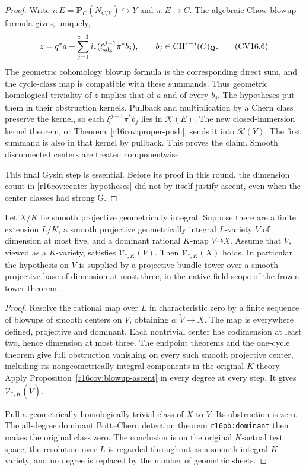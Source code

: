 \begin{proof}
Write $i:E=\mathbf P_C(N_{C/V})\hookrightarrow Y$ and $\pi:E\to C$.
The algebraic Chow blowup formula gives, uniquely,
\[
 z=q^*a+\sum_{j=1}^{c-1}
                i_*(\xi_{\rm alg}^{j-1}\pi^*b_j),
 \qquad b_j\in\operatorname{CH}^{r-j}(C)_{\mathbf Q}.
 \tag{CV16.6}\label{r16cov:blowup-cycle}
\]
The geometric cohomology blowup formula is the corresponding direct
sum, and the cycle-class map is compatible with these summands.
Thus geometric homological triviality of $z$ implies that of $a$
and of every $b_j$.  The hypotheses put them in their obstruction
kernels.  Pullback and multiplication by a Chern class preserve the
kernel, so each $\xi^{j-1}\pi^*b_j$ lies in $\mathcal K(E)$.
The new closed-immersion kernel theorem, or
Theorem~\ref{r16cov:proper-push}, sends it into $\mathcal K(Y)$.
The first summand is also in that kernel by pullback.  This proves
the claim.  Smooth disconnected centers are treated componentwise.

This final Gysin step is essential.  Before its proof in this round,
the dimension count in \eqref{r16cov:center-hypotheses} did not by
itself justify ascent, even when the center classes had strong G.
\end{proof}

\begin{theorem}
\label{r16cov:rational-low-dimension}
Let $X/K$ be smooth projective geometrically integral.  Suppose there
are a finite extension $L/K$, a smooth projective geometrically
integral $L$-variety $V$ of dimension at most five, and a dominant
rational $K$-map $V\dashrightarrow X$.  Assume that $V$, viewed as
a $K$-variety, satisfies $\mathcal V_{*,K}(V)$.
Then $\mathcal V_{*,K}(X)$ holds.  In particular the hypothesis on
$V$ is supplied by a projective-bundle tower over a smooth projective
base of dimension at most three, in the native-field scope of the
frozen tower theorem.
\end{theorem}

\begin{proof}
Resolve the rational map over $L$ in characteristic zero by a finite
sequence of blowups of smooth centers on $V$, obtaining
$a:\widetilde V\to X$.  The map is everywhere defined, projective
and dominant.  Each nontrivial center has codimension at least two,
hence dimension at most three.  The endpoint theorems and the
one-cycle theorem give full obstruction vanishing on every such
smooth projective center, including its nongeometrically integral
components in the original $K$-theory.  Apply
Proposition~\ref{r16cov:blowup-ascent} in every degree at every step.
It gives $\mathcal V_{*,K}(\widetilde V)$.

Pull a geometrically homologically trivial class of $X$ to
$\widetilde V$.  Its obstruction is zero.  The all-degree dominant
Bott--Chern detection theorem \texttt{r16pb:dominant} then makes
the original class zero.  The conclusion is on the original
$K$-actual test space; the resolution over $L$ is regarded throughout
as a smooth integral $K$-variety, and no degree is replaced by the
number of geometric sheets.
\end{proof}

